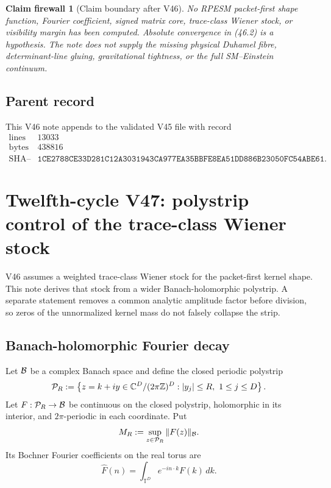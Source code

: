 \documentclass[11pt]{article}
\newtheorem{firewall}[theorem]{Claim firewall}
\theoremstyle{remark}
\begin{document}
\begin{firewall}[Claim boundary after V46]
\label{fire:v12v46-claim}
No RPESM packet-first shape function, Fourier coefficient, signed
matrix core, trace-class Wiener stock, or visibility margin has been
computed.  Absolute convergence in (46.2) is a hypothesis.  The note
does not supply the missing physical Duhamel fibre, determinant-line
gluing, gravitational tightness, or the full SM--Einstein continuum.
\end{firewall}

\subsection{Parent record}

This V46 note appends to the validated V45 file with record
\[
\begin{array}{c|c}
\text{lines}&13033\\
\text{bytes}&438816\\
\text{SHA--256}&
\texttt{1CE2788CE33D281C12A3031943CA977EA35BBFE8EA51DD886B23050FC54ABE61}.
\end{array}
\]


\section{Twelfth-cycle V47: polystrip control of the trace-class
Wiener stock}
\label{sec:v12v47}

V46 assumes a weighted trace-class Wiener stock for the packet-first
kernel shape.  This note derives that stock from a wider
Banach-holomorphic polystrip.  A separate statement removes a common
analytic amplitude factor before division, so zeros of the
unnormalized kernel mass do not falsely collapse the strip.

\subsection{Banach-holomorphic Fourier decay}

Let \({\cal B}\) be a complex Banach space and define the closed
periodic polystrip
\[
 {\cal P}_R
 :=
 \left\{
 z=k+iy\in\mathbb C^D/(2\pi\mathbb Z)^D:
 |y_j|\leq R,\ 1\leq j\leq D
 \right\}.
\]
Let \(F:{\cal P}_R\to{\cal B}\) be continuous on the closed
polystrip, holomorphic in its interior, and \(2\pi\)-periodic in
each coordinate.  Put
\[
 M_R:=\sup_{z\in{\cal P}_R}\|F(z)\|_{\cal B}.
\]
Its Bochner Fourier coefficients on the real torus are
\[
 \widehat F(n)
 =
 \int_{{\mathbb T}^D}e^{-in\cdot k}F(k)\,dk.
\]
\end{document}
